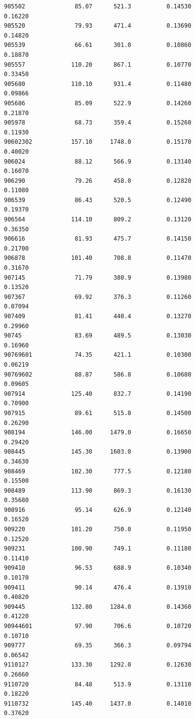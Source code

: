 \documentclass[
  letterpaper,
  DIV=11,
  numbers=noendperiod]{scrartcl}
\begin{document}
\begin{verbatim}
905502              85.07      521.3          0.14530           0.16220
905520              79.93      471.4          0.13690           0.14820
905539              66.61      301.0          0.10860           0.18870
905557             110.20      867.1          0.10770           0.33450
905680             110.10      931.4          0.11480           0.09866
905686              85.09      522.9          0.14260           0.21870
905978              68.73      359.4          0.15260           0.11930
90602302           157.10     1748.0          0.15170           0.40020
906024              88.12      566.9          0.13140           0.16070
906290              79.26      458.0          0.12820           0.11080
906539              86.43      520.5          0.12490           0.19370
906564             114.10      809.2          0.13120           0.36350
906616              81.93      475.7          0.14150           0.21700
906878             101.40      708.8          0.11470           0.31670
907145              71.79      380.9          0.13980           0.13520
907367              69.92      376.3          0.11260           0.07094
907409              81.41      440.4          0.13270           0.29960
90745               83.69      489.5          0.13030           0.16960
90769601            74.35      421.1          0.10300           0.06219
90769602            88.87      586.8          0.10680           0.09605
907914             125.40      832.7          0.14190           0.70900
907915              89.61      515.8          0.14500           0.26290
908194             146.00     1479.0          0.16650           0.29420
908445             145.30     1603.0          0.13900           0.34630
908469             102.30      777.5          0.12180           0.15500
908489             113.90      869.3          0.16130           0.35680
908916              95.14      626.9          0.12140           0.16520
909220             101.20      750.0          0.11950           0.12520
909231             100.90      749.1          0.11180           0.11410
909410              96.53      688.9          0.10340           0.10170
909411              90.14      476.4          0.13910           0.40820
909445             132.80     1284.0          0.14360           0.41220
90944601            97.90      706.6          0.10720           0.10710
909777              69.35      366.3          0.09794           0.06542
9110127            133.30     1292.0          0.12630           0.26660
9110720             84.48      513.9          0.13110           0.18220
9110732            145.40     1437.0          0.14010           0.37620

\end{verbatim}
\end{document}
